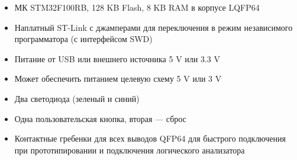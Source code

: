 \bigskip
\begin{itemize}
\item МК STM32F100RB, 128 KB Flash, 8 KB RAM в корпусе LQFP64
\item Наплатный ST-Link с джамперами для переключения в режим независимого 
программатора (с интерфейсом SWD)
\item Питание от USB или внешнего источника 5 V или 3.3 V
\item Может обеспечить питанием целевую схему 5 V или 3 V
\item Два светодиода (зеленый и синий)
\item Одна пользовательская кнопка, вторая --- сброс
\item Контактные гребенки для всех выводов QFP64 для быстрого подключения
при прототипировании и подключения логического анализатора
\end{itemize}
